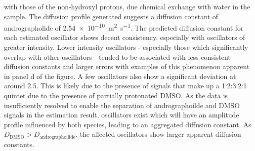 with those of the non-hydroxyl protons, due chemical exchange with water in the
sample\cite{Chen1998}.
The diffusion profile generated suggests a diffusion constant of andrographolide of
\qty{2.54e-10}{\meter\squared\per\second}. The predicted diffusion constant for
each estimated oscillator shows decent consistency, especially with oscillators
of greater intensity. Lower intensity oscillators - especially those which
significantly overlap with other oscillators - tended to be associated with
less consistent diffusion constants and larger errors with examples of this
phenomenon apparent in panel d of the figure. A few oscillators also show a
significant deviation at around \qty{2.5}{\partspermillion}. This is likely due to
the presence of signals that make up a 1:2:3:2:1 quintet due to the presence of
partially protonated \acs{DMSO}. As the data is
insufficiently resolved to enable the separation of andrographoilde and
\ac{DMSO} signals in the estimation result, oscillators exist which
will have an amplitude profile influenced by both species, leading to an
aggregated diffusion constant. As $D_{\text{DMSO}} >
D_{\text{andrographoilide}}$, the affected oscillators show larger apparent
diffusion constants.


